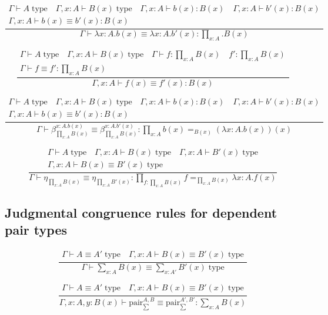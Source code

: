 \documentclass{book}
\begin{document}
$$\frac{
\begin{array}{c}
	\Gamma \vdash A \; \mathrm{type} \quad \Gamma, x:A \vdash B(x) \; \mathrm{type} \quad \Gamma, x:A \vdash b(x):B(x) \quad \Gamma, x:A \vdash b'(x):B(x) \\ 
	\Gamma, x:A \vdash b(x) \equiv b'(x):B(x)
\end{array}
}{\Gamma \vdash \lambda x:A.b(x) \equiv \lambda x:A.b'(x):\prod_{x:A}.B(x)}$$

$$\frac{
\begin{array}{c}
	\Gamma \vdash A \; \mathrm{type} \quad \Gamma, x:A \vdash B(x) \; \mathrm{type} \quad \Gamma \vdash f:\prod_{x:A} B(x) \quad f':\prod_{x:A} B(x) \\
	\Gamma \vdash f \equiv f':\prod_{x:A} B(x)
\end{array}
}{\Gamma, x:A \vdash f(x) \equiv f'(x):B(x)}$$

$$\frac{
\begin{array}{c}
	\Gamma \vdash A \; \mathrm{type} \quad \Gamma, x:A \vdash B(x) \; \mathrm{type} \quad \Gamma, x:A \vdash b(x):B(x) \quad \Gamma, x:A \vdash b'(x):B(x) \\ 
	\Gamma, x:A \vdash b(x) \equiv b'(x):B(x)
\end{array}
}{\Gamma \vdash \beta_{\prod_{x:A} B(x)}^{x:A.b(x)} \equiv \beta_{\prod_{x:A} B(x)}^{x:A.b'(x)}:\prod_{x:A} b(x) =_{B(x)} (\lambda x:A.b(x))(x)}$$

$$\frac{
\begin{array}{c}
	\Gamma \vdash A \; \mathrm{type} \quad \Gamma, x:A \vdash B(x) \; \mathrm{type} \quad \Gamma, x:A \vdash B'(x) \; \mathrm{type} \\
	\Gamma, x:A \vdash B(x) \equiv B'(x) \; \mathrm{type}
\end{array}
}{\Gamma \vdash \eta_{\prod_{x:A} B(x)} \equiv \eta_{\prod_{x:A} B'(x)}:\prod_{f:\prod_{x:A} B(x)} f =_{\prod_{x:A} B(x)} \lambda x:A.f(x)}$$

\subsection{Judgmental congruence rules for dependent pair types}

$$\frac{
\begin{array}{c}
	\Gamma \vdash A \equiv A' \; \mathrm{type} \quad \Gamma, x:A \vdash B(x) \equiv B'(x) \; \mathrm{type}
\end{array}
}{\Gamma \vdash \sum_{x:A} B(x) \equiv \sum_{x:A'} B'(x)\; \mathrm{type}}$$

$$\frac{
\begin{array}{c}
	\Gamma \vdash A \equiv A' \; \mathrm{type} \quad \Gamma, x:A \vdash B(x) \equiv B'(x) \; \mathrm{type}
\end{array}
}{\Gamma, x:A, y:B(x) \vdash \mathrm{pair}_{\sum}^{A, B} \equiv \mathrm{pair}_{\sum}^{A', B'}:\sum_{x:A} B(x)}$$
\end{document}
